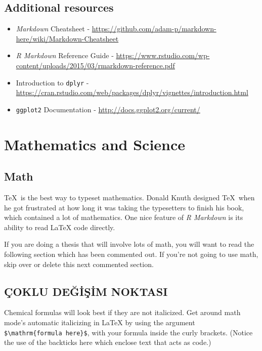 \documentclass[12pt,twoside]{deuthesis}
\begin{document}
\hypertarget{additional-resources}{%
\section{Additional resources}\label{additional-resources}}
\begin{itemize}
\item
  \emph{Markdown} Cheatsheet - \url{https://github.com/adam-p/markdown-here/wiki/Markdown-Cheatsheet}
\item
  \emph{R Markdown} Reference Guide - \url{https://www.rstudio.com/wp-content/uploads/2015/03/rmarkdown-reference.pdf}
\item
  Introduction to \texttt{dplyr} - \url{https://cran.rstudio.com/web/packages/dplyr/vignettes/introduction.html}
\item
  \texttt{ggplot2} Documentation - \url{http://docs.ggplot2.org/current/}
\end{itemize}
\hypertarget{math-sci}{%
\chapter{Mathematics and Science}\label{math-sci}}

\hypertarget{math}{%
\section{Math}\label{math}}

\TeX~is the best way to typeset mathematics. Donald Knuth designed \TeX~when he got frustrated at how long it was taking the typesetters to finish his book, which contained a lot of mathematics. One nice feature of \emph{R Markdown} is its ability to read LaTeX code directly.

If you are doing a thesis that will involve lots of math, you will want to read the following section which has been commented out. If you're not going to use math, skip over or delete this next commented section.

\hypertarget{uxe7oklu-deux11fiux15fim-noktasi}{%
\section{ÇOKLU DEĞİŞİM NOKTASI}\label{uxe7oklu-deux11fiux15fim-noktasi}}

Chemical formulas will look best if they are not italicized. Get around math mode's automatic italicizing in LaTeX by using the argument \texttt{\$\textbackslash{}mathrm\{formula\ here\}\$}, with your formula inside the curly brackets. (Notice the use of the backticks here which enclose text that acts as code.)
\end{document}
